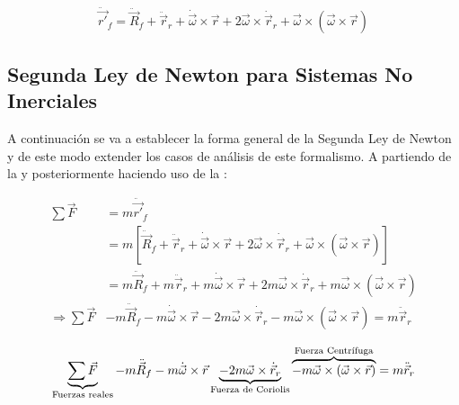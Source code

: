 \documentclass[/home/hernan-barquero/Documents/Apuntes_mecanica_teorica/main.tex]{subfiles}
\begin{document}
	\begin{definition}
		\begin{equation}
			\ddot{ \vec{{r}'}}_{f}  = \ddot{\vec{R}}_{f} + \ddot{ \vec{r}}_{r} + \dot{\vec{\omega}} \times \vec{r}  + 2\vec{\omega} \times \dot{ \vec{r}}_{r} + \vec{\omega} \times \left( \vec{\omega} \times \vec{r}  \right)
			\label{eq: ainirelation}
		\end{equation}
	\end{definition}

	\subsection{Segunda Ley de Newton para Sistemas No Inerciales}

	A continuación se va a establecer la forma general de la Segunda Ley de Newton y de este modo extender los casos de análisis de este formalismo. A partiendo de la  y posteriormente haciendo uso de la :

	\begin{align*}
		\sum \vec{F} &= m \ddot{\vec{{r}'}}_{f} \\
		& = m \left[ \ddot{\vec{R}}_{f} + \ddot{ \vec{r}}_{r} + \dot{\vec{\omega}} \times \vec{r}  + 2\vec{\omega} \times \dot{ \vec{r}}_{r} + \vec{\omega} \times \left( \vec{\omega} \times \vec{r}  \right) \right] \\ 
		& = m\ddot{\vec{R}}_{f} + m\ddot{ \vec{r}}_{r} + m \dot{\vec{\omega}} \times \vec{r} + 2m \vec{\omega} \times \dot{ \vec{r}}_{r} + m \vec{\omega} \times \left( \vec{\omega} \times \vec{r}  \right) \\ 
		\Rightarrow \sum \vec{F} & - m\ddot{\vec{R}}_{f} -  m \dot{\vec{\omega}} \times \vec{r} - 2m \vec{\omega} \times \dot{ \vec{r}}_{r} - m \vec{\omega} \times \left( \vec{\omega} \times \vec{r}  \right) = m\ddot{ \vec{r}}_{r}
	\end{align*}

	\begin{definition}
		\begin{equation}
			\underbrace{\sum \vec{F}}_{\textup{Fuerzas reales}} - m\ddot{\vec{R}}_{f} -  m \dot{\vec{\omega}} \times \vec{r} \underbrace{- 2m \vec{\omega} \times \dot{ \vec{r}}_{r}}_{\textup{Fuerza de Coriolis}}  \overbrace{- m \vec{\omega} \times \left( \vec{\omega} \times \vec{r}  \right)}^{\textup{Fuerza Centrífuga}} = m\ddot{ \vec{r}}_{r}
			\label{eq: NSecondlawnoinertial}
		\end{equation}
	\end{definition}
	
\end{document}

